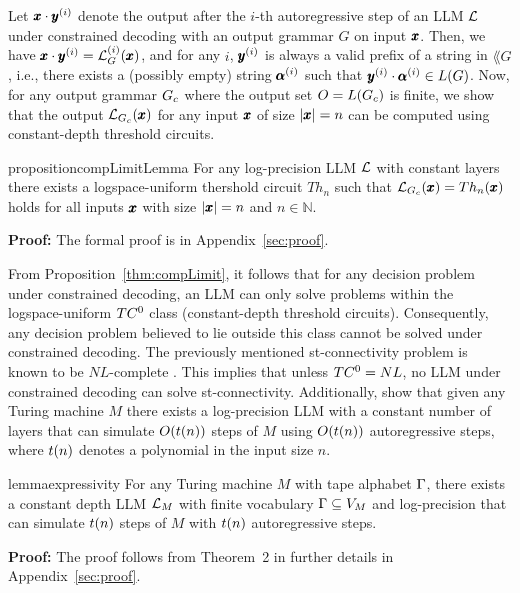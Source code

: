 Let $\vect{x} \cdot \vect{y}^{(i)}$ denote the output after the $i$-th autoregressive step of an LLM $\llm{}$ under constrained decoding with an output grammar $G$ on input $\vect{x}$. Then, we have $\vect{x} \cdot \vect{y}^{(i)} = \llmFormalG{i}{\vect{x}}{G}$, and for any $i$, $\vect{y}^{(i)}$ is always a valid prefix of a string in $\lang{G}$, i.e., there exists a (possibly empty) string $\vect{\alpha}^{(i)}$ such that $\vect{y}^{(i)} \cdot \vect{\alpha}^{(i)} \in \lang{G}$. Now, for any output grammar $\regG$ where the output set $O = L(\regG)$ is finite, we show that the output $\llmG{\vect{x}}{\regG}$ for any input $\vect{x}$ of size $|\vect{x}| = n$ can be computed using constant-depth threshold circuits.
\begin{restatable}{proposition}{compLimitLemma}
\label{thm:compLimit}
For any log-precision LLM $\llm{}$ with constant layers there exists a logspace-uniform thershold circuit $Th_{n}$ such that $\llmG{\vect{x}}{\regG} = Th_n(\vect{x})$ holds for all inputs $\vect{x}$ with size $|\vect{x}| = n$ and $n \in \mathbb{N}$.
\end{restatable}
\textbf{Proof:} The formal proof is in Appendix~\ref{sec:proof}. 

From Proposition~\ref{thm:compLimit}, it follows that for any decision problem under constrained decoding, an LLM can only solve problems within the logspace-uniform $\class$ class (constant-depth threshold circuits). 
Consequently, any decision problem believed to lie outside this class cannot be solved under constrained decoding. 
The previously mentioned st-connectivity problem is known to be $NL$-complete \cite{complexityBook}. This implies that unless $\class = NL$, no LLM under constrained decoding can solve st-connectivity.  
Additionally, \cite{expressivity2, expressivity1} show that given any Turing machine $M$ there exists a log-precision LLM with a constant number of layers that can simulate $O(\runtime{n})$ steps of $M$ using $O(\runtime{n})$ autoregressive steps, where $\runtime{n}$ denotes a polynomial in the input size $n$.

\begin{restatable}{lemma}{expressivity}
\label{lem:expressivity}
For any Turing machine $M$ with tape alphabet $\tapealpha$, there exists a constant depth LLM $\llm{}_{M}$ with finite vocabulary $\tapealpha \subseteq \vGM$ and log-precision that can simulate $\runtime{n}$ steps of $M$ with $\runtime{n}$ autoregressive steps. 
\end{restatable}
\textbf{Proof:} The proof follows from Theorem~2 in \cite{expressivity1} further details in Appendix~\ref{sec:proof}.

